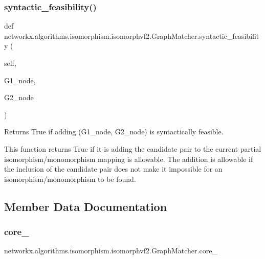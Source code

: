 \subsubsection{\texorpdfstring{syntactic\+\_\+feasibility()}{syntactic\_feasibility()}}
{\footnotesize\ttfamily def networkx.\+algorithms.\+isomorphism.\+isomorphvf2.\+Graph\+Matcher.\+syntactic\+\_\+feasibility (\begin{DoxyParamCaption}\item[{}]{self,  }\item[{}]{G1\+\_\+node,  }\item[{}]{G2\+\_\+node }\end{DoxyParamCaption})}

\begin{DoxyVerb}Returns True if adding (G1_node, G2_node) is syntactically feasible.

This function returns True if it is adding the candidate pair
to the current partial isomorphism/monomorphism mapping is allowable.
The addition is allowable if the inclusion of the candidate pair does
not make it impossible for an isomorphism/monomorphism to be found.
\end{DoxyVerb}
 

\subsection{Member Data Documentation}
\mbox{\label{classnetworkx_1_1algorithms_1_1isomorphism_1_1isomorphvf2_1_1GraphMatcher_ad3e55bc9fa84b116c81ae1e0b2434554}} 
\subsubsection{\texorpdfstring{core\+\_}{core\_1}}
{\footnotesize\ttfamily networkx.\+algorithms.\+isomorphism.\+isomorphvf2.\+Graph\+Matcher.\+core\+\_}

\mbox{\label{classnetworkx_1_1algorithms_1_1isomorphism_1_1isomorphvf2_1_1GraphMatcher_ab373363db0399019c0f086fa09c783f5}} 
